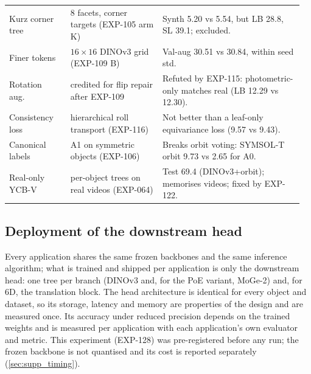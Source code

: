 \begin{table}[t]
\begin{tabular}{@{}p{0.2\linewidth}p{0.3\linewidth}p{0.46\linewidth}@{}}
    \raggedright Kurz corner tree & \raggedright 8 facets, corner targets (EXP-105 arm K) & \raggedright Synth 5.20 vs 5.54, but LB 28.8, SL 39.1; excluded.\tabularnewline
    \raggedright Finer tokens & \raggedright $16\times16$ DINOv3 grid (EXP-109 B) & \raggedright Val-aug 30.51 vs 30.84, within seed std.\tabularnewline
    \raggedright Rotation aug.\ & \raggedright credited for flip repair after EXP-109 & \raggedright Refuted by EXP-115: photometric-only matches real (LB 12.29 vs 12.30).\tabularnewline
    \raggedright Consistency loss & \raggedright hierarchical roll transport (EXP-116) & \raggedright Not better than a leaf-only equivariance loss (9.57 vs 9.43).\tabularnewline
    \raggedright Canonical labels & \raggedright A1 on symmetric objects (EXP-106) & \raggedright Breaks orbit voting: SYMSOL-T orbit 9.73 vs 2.65 for A0.\tabularnewline
    \raggedright Real-only YCB-V & \raggedright per-object trees on real videos (EXP-064) & \raggedright Test 69.4 (DINOv3+orbit); memorises videos; fixed by EXP-122.\tabularnewline
    \bottomrule
  \end{tabular}
\end{table}

\subsection{Deployment of the downstream head}\label{app:deploy}
Every application shares the same frozen backbones and the same inference algorithm; what is trained and shipped per application is only the downstream head: one tree per branch (DINOv3 and, for the PoE variant, MoGe-2) and, for 6D, the translation block. The head architecture is identical for every object and dataset, so its storage, latency and memory are properties of the design and are measured once. Its accuracy under reduced precision depends on the trained weights and is measured per application with each application's own evaluator and metric. This experiment (EXP-128) was pre-registered before any run; the frozen backbone is not quantised and its cost is reported separately (\cref{sec:supp_timing}).

